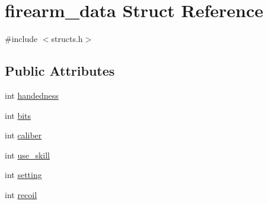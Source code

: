 \hypertarget{structfirearm__data}{\section{firearm\-\_\-data Struct Reference}
\label{structfirearm__data}
}


{\ttfamily \#include $<$structs.\-h$>$}

\subsection*{Public Attributes}
\begin{DoxyCompactItemize}
\item 
int \hyperlink{structfirearm__data_afcc3b09e0b9265b8f744bde08a722af7}{handedness}
\item 
int \hyperlink{structfirearm__data_a2299ff148fc0cf282f8ba6cdb1e3b2c2}{bits}
\item 
int \hyperlink{structfirearm__data_a3cee40a699ac83198eeb87558d37b4e5}{caliber}
\item 
int \hyperlink{structfirearm__data_a2b7980961b78c7521e1d33be34ca1bbd}{use\-\_\-skill}
\item 
int \hyperlink{structfirearm__data_abcdf5e78cbcf3d2cb530e21aef3338bf}{setting}
\item 
int \hyperlink{structfirearm__data_adf714faac6c2473fc6a4b6a21e7a9595}{recoil}
\end{DoxyCompactItemize}


